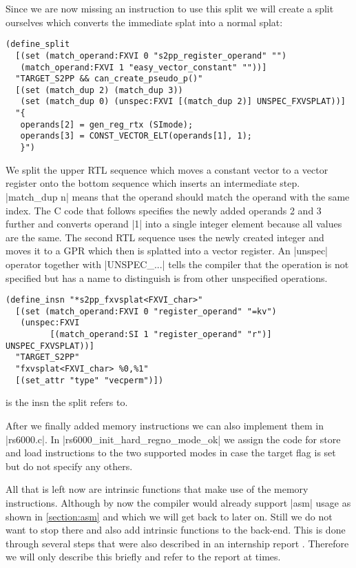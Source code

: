 Since we are now missing an instruction to use this split we will create a split ourselves which converts the immediate splat into a normal splat:
\begin{lstlisting}
(define_split
  [(set (match_operand:FXVI 0 "s2pp_register_operand" "")
   (match_operand:FXVI 1 "easy_vector_constant" ""))]
  "TARGET_S2PP && can_create_pseudo_p()"
  [(set (match_dup 2) (match_dup 3))
   (set (match_dup 0) (unspec:FXVI [(match_dup 2)] UNSPEC_FXVSPLAT))]
  "{
   operands[2] = gen_reg_rtx (SImode);
   operands[3] = CONST_VECTOR_ELT(operands[1], 1);
   }")
\end{lstlisting}

We split the upper RTL sequence which moves a constant vector to a vector register onto the bottom sequence which inserts an intermediate step.
|match_dup n| means that the operand should match the operand with the same index.
The C code that follows specifies the newly added operands 2 and 3 further and converts operand |1| into a single integer element because all values are the same.
The second RTL sequence uses the newly created integer and moves it to a GPR which then is splatted into a vector register.
An |unspec| operator together with |UNSPEC_...| tells the compiler that the operation is not specified but has a name to distinguish is from other unspecified operations.

\begin{lstlisting}
(define_insn "*s2pp_fxvsplat<FXVI_char>"
  [(set (match_operand:FXVI 0 "register_operand" "=kv")
   (unspec:FXVI
         [(match_operand:SI 1 "register_operand" "r")] UNSPEC_FXVSPLAT))]
  "TARGET_S2PP"
  "fxvsplat<FXVI_char> %0,%1"
  [(set_attr "type" "vecperm")])
\end{lstlisting}
is the insn the split refers to.

After we finally added memory instructions we can also implement them in |rs6000.c|.
In |rs6000_init_hard_regno_mode_ok| we assign the code for store and load instructions to the two supported modes in case the target flag is set but do not specify any others.

All that is left now are intrinsic functions that make use of the memory instructions.
Although by now the compiler would already support |asm| usage as shown in \ref{section:asm} and which we will get back to later on.
Still we do not want to stop there and also add intrinsic functions to the back-end.
This is done through several steps that were also described in an internship report \cite{heimbrecht}.
Therefore we will only describe this briefly and refer to the report at times.

